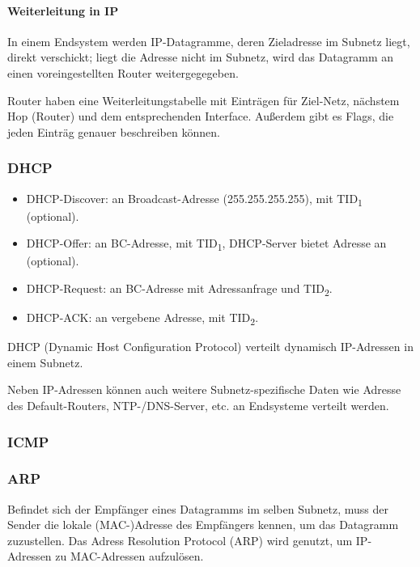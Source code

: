 \documentclass[a4paper, 14pt]{article}
\begin{document}
	\paragraph{Weiterleitung in IP}

	In einem Endsystem werden IP-Datagramme, deren Zieladresse im Subnetz liegt, direkt verschickt; liegt die Adresse nicht im Subnetz, wird das Datagramm an einen voreingestellten Router weitergegegeben.
	
	Router haben eine Weiterleitungstabelle mit Einträgen für Ziel-Netz, nächstem Hop (Router) und dem entsprechenden Interface.
	Außerdem gibt es Flags, die jeden Einträg genauer beschreiben können.


	\subsubsection{DHCP}

	\begin{itemize}
		\item DHCP-Discover: an Broadcast-Adresse (255.255.255.255), mit TID\textsubscript{1} (optional).
		\item DHCP-Offer: an BC-Adresse, mit TID\textsubscript{1}, DHCP-Server bietet Adresse an (optional).
		\item DHCP-Request: an BC-Adresse mit Adressanfrage und TID\textsubscript{2}.
		\item DHCP-ACK: an vergebene Adresse, mit TID\textsubscript{2}.
	\end{itemize}

	DHCP (Dynamic Host Configuration Protocol) verteilt dynamisch IP-Adressen in einem Subnetz.
	
	Neben IP-Adressen können auch weitere Subnetz-spezifische Daten wie Adresse des Default-Routers, NTP-/DNS-Server, etc. an Endsysteme verteilt werden.


	\subsubsection{ICMP}


	\subsubsection{ARP}

	Befindet sich der Empfänger eines Datagramms im selben Subnetz, muss der Sender die lokale (MAC-)Adresse des Empfängers kennen, um das Datagramm zuzustellen.
	Das Adress Resolution Protocol (ARP) wird genutzt, um IP-Adressen zu MAC-Adressen aufzulösen.
	
\end{document}
